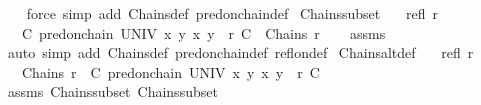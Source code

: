 \begin{isabellebody}
%
\isadelimproof
\ \ %
\endisadelimproof
%
\isatagproof
{}\isamarkupfalse%
\ {\isacharparenleft}{\kern0pt}force\ simp\ add{\isacharcolon}{\kern0pt}\ Chains{\isacharunderscore}{\kern0pt}def\ pred{\isacharunderscore}{\kern0pt}on{\isachardot}{\kern0pt}chain{\isacharunderscore}{\kern0pt}def{\isacharparenright}{\kern0pt}%
\endisatagproof
{\isafoldproof}%
%
\isadelimproof
\isanewline
%
\endisadelimproof
\isanewline
{}\isamarkupfalse%
\ Chains{\isacharunderscore}{\kern0pt}subset{\isacharprime}{\kern0pt}{\isacharcolon}{\kern0pt}\isanewline
\ \ \ {\isachardoublequoteopen}refl\ r{\isachardoublequoteclose}\isanewline
\ \ \ {\isachardoublequoteopen}{\isacharbraceleft}{\kern0pt}C{\isachardot}{\kern0pt}\ pred{\isacharunderscore}{\kern0pt}on{\isachardot}{\kern0pt}chain\ UNIV\ {\isacharparenleft}{\kern0pt}{\isasymlambda}x\ y{\isachardot}{\kern0pt}\ {\isacharparenleft}{\kern0pt}x{\isacharcomma}{\kern0pt}\ y{\isacharparenright}{\kern0pt}\ {\isasymin}\ r{\isacharparenright}{\kern0pt}\ C{\isacharbraceright}{\kern0pt}\ {\isasymsubseteq}\ Chains\ r{\isachardoublequoteclose}\isanewline
%
\isadelimproof
\ \ %
\endisadelimproof
%
\isatagproof
{}\isamarkupfalse%
\ assms\isanewline
\ \ \isamarkupfalse%
\ {\isacharparenleft}{\kern0pt}auto\ simp\ add{\isacharcolon}{\kern0pt}\ Chains{\isacharunderscore}{\kern0pt}def\ pred{\isacharunderscore}{\kern0pt}on{\isachardot}{\kern0pt}chain{\isacharunderscore}{\kern0pt}def\ refl{\isacharunderscore}{\kern0pt}on{\isacharunderscore}{\kern0pt}def{\isacharparenright}{\kern0pt}%
\endisatagproof
{\isafoldproof}%
%
\isadelimproof
\isanewline
%
\endisadelimproof
\isanewline
{}\isamarkupfalse%
\ Chains{\isacharunderscore}{\kern0pt}alt{\isacharunderscore}{\kern0pt}def{\isacharcolon}{\kern0pt}\isanewline
\ \ \ {\isachardoublequoteopen}refl\ r{\isachardoublequoteclose}\isanewline
\ \ \ {\isachardoublequoteopen}Chains\ r\ {\isacharequal}{\kern0pt}\ {\isacharbraceleft}{\kern0pt}C{\isachardot}{\kern0pt}\ pred{\isacharunderscore}{\kern0pt}on{\isachardot}{\kern0pt}chain\ UNIV\ {\isacharparenleft}{\kern0pt}{\isasymlambda}x\ y{\isachardot}{\kern0pt}\ {\isacharparenleft}{\kern0pt}x{\isacharcomma}{\kern0pt}\ y{\isacharparenright}{\kern0pt}\ {\isasymin}\ r{\isacharparenright}{\kern0pt}\ C{\isacharbraceright}{\kern0pt}{\isachardoublequoteclose}\isanewline
%
\isadelimproof
\ \ %
\endisadelimproof
%
\isatagproof
{}\isamarkupfalse%
\ assms\ Chains{\isacharunderscore}{\kern0pt}subset\ Chains{\isacharunderscore}{\kern0pt}subset{\isacharprime}{\kern0pt}\ \isamarkupfalse%

\end{isabellebody}
